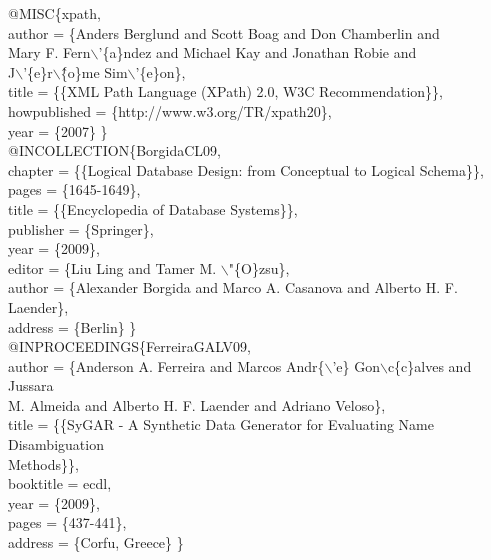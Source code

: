 \documentclass[kdmile,a4paper]{kdmile} %
\newenvironment{latexcode}
{\ttfamily\vspace{0.1in}\setlength{\parindent}{18pt}}
{\vspace{0.1in}}
\begin{document}
\begin{latexcode}
@MISC\{xpath, \\\indent\indent
  author = \{Anders Berglund and Scott Boag and Don Chamberlin and \\\indent\indent
  Mary F. Fern$\backslash$'\{a\}ndez and Michael Kay  and Jonathan Robie and \\\indent\indent
  J$\backslash$'\{e\}r$\backslash$\^\{o\}me Sim$\backslash$'\{e\}on\},\\\indent\indent
  title = \{\{XML Path Language (XPath) 2.0, W3C Recommendation\}\},\\\indent\indent
  howpublished = \{http://www.w3.org/TR/xpath20\},\\\indent\indent
  year = \{2007\} \}\\

@INCOLLECTION\{BorgidaCL09,\\\indent\indent
  chapter = \{\{Logical Database Design: from Conceptual to Logical Schema\}\},\\\indent\indent
  pages = \{1645-1649\},\\\indent\indent
  title = \{\{Encyclopedia of Database Systems\}\},\\\indent\indent
  publisher = \{Springer\},\\\indent\indent
  year = \{2009\},\\\indent\indent
  editor = \{Liu Ling and Tamer M. $\backslash$"\{O\}zsu\},\\\indent\indent
  author = \{Alexander Borgida and Marco A. Casanova and Alberto H. F. Laender\},\\\indent\indent
  address = \{Berlin\} \}\\

@INPROCEEDINGS\{FerreiraGALV09,\\\indent\indent
  author = \{Anderson A. Ferreira and Marcos Andr\{$\backslash$'e\} Gon$\backslash$c\{c\}alves and Jussara\\\indent\indent
	M. Almeida and Alberto H. F. Laender and Adriano Veloso\},\\\indent\indent
  title = \{\{SyGAR - A Synthetic Data Generator for Evaluating Name Disambiguation\\\indent\indent
	Methods\}\},\\\indent\indent
  booktitle = ecdl,\\\indent\indent
  year = \{2009\},\\\indent\indent
  pages = \{437-441\},\\\indent\indent
  address = \{Corfu, Greece\} \}\\


\end{latexcode}
\end{document}
